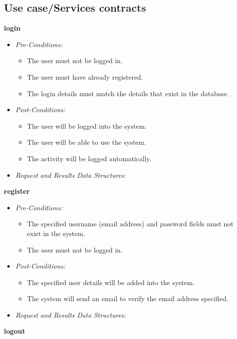\documentclass[a4paper,12pt]{article}
\begin{document}

\subsection{Use case/Services contracts}
\textbf{\large{login}}
	\begin{itemize}
		\item \textit{Pre-Conditions:}
			\begin{itemize}
				\item The user must not be logged in.
				\item The user must have already registered.
				\item The login details must match the details that exist in the database.
			\end{itemize}
		\item \textit{Post-Conditions:}
			\begin{itemize}
				\item The user will be logged into the system.
				\item The user will be able to use the system.
				\item The activity will be logged automatically.
			\end{itemize}
		\item \textit{Request and Results Data Structures:}
	\end{itemize}
\textbf{\large{register}}
	\begin{itemize}
		\item \textit{Pre-Conditions:}
			\begin{itemize}
				\item The specified username (email address) and password fields must not exist in the system.
				\item The user must not be logged in.
			\end{itemize}
		\item \textit{Post-Conditions:}
			\begin{itemize}
				\item The specified user details will be added into the system.
				\item The system will send an email to verify the email address specified.
			\end{itemize}
		\item \textit{Request and Results Data Structures:}
	\end{itemize}
\textbf{\large{logout}}
\end{document}
